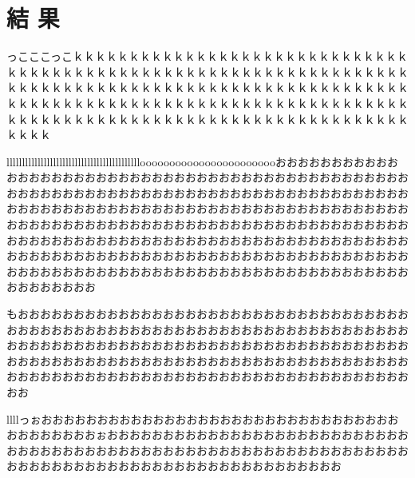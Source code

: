 \section{結 果}
っこここっこｋｋｋｋｋｋｋｋｋｋｋｋｋｋｋｋｋｋｋｋｋｋｋｋｋｋｋｋｋｋｋｋｋｋｋｋｋｋｋｋｋｋｋｋｋｋｋｋｋｋｋｋｋｋｋｋｋｋｋｋｋｋｋｋｋｋｋｋｋｋｋｋｋｋｋｋｋｋｋｋｋｋｋｋｋｋｋｋｋｋｋｋｋｋｋｋｋｋｋｋｋｋｋｋｋｋｋｋｋｋｋｋｋｋｋｋｋｋｋｋｋｋｋｋｋｋｋｋｋｋｋｋｋｋｋｋｋｋｋｋｋｋｋｋｋｋｋｋｋｋｋｋｋｋｋｋｋｋｋｋｋｋｋｋｋｋｋｋｋｋｋｋｋｋｋｋｋｋ

llllllllllllllllllllllllllllllllllllllllllloooooooooooooooooooooooおおおおおおおおおおおおおおおおおおおおおおおおおおおおおおおおおおおおおおおおおおおおおおおおおおおおおおおおおおおおおおおおおおおおおおおおおおおおおおおおおおおおおおおおおおおおおおおおおおおおおおおおおおおおおおおおおおおおおおおおおおおおおおおおおおおおおおおおおおおおおおおおおおおおおおおおおおおおおおおおおおおおおおおおおおおおおおおおおおおおおおおおおおおおおおおおおおおおおおおおおおおおおおおおおおおおおおおおおおおおおおおおおおおおおおおおおおおおおおおおおおおおおおおおおおおおおおおおおおおおおおおおおおおおおおお


もおおおおおおおおおおおおおおおおおおおおおおおおおおおおおおおおおおおおおおおおおおおおおおおおおおおおおおおおおおおおおおおおおおおおおおおおおおおおおおおおおおおおおおおおおおおおおおおおおおおおおおおおおおおおおおおおおおおおおおおおおおおおおおおおおおおおおおおおおおおおおおおおおおおおおおおおおおおおおおおおおおおおおおおおおおおおおおおおおおおおお

llllっぉおおおおおおおおおおおおおおおおおおおおおおおおおおおおおおおおおおおおおおおおぉおおおおおおおおおおおおおおおおおおおおおおおおおおおおおおおおおおおおおおおおおおおおおおおおおおおおおおおおおおおおおおおおおおおおおおおおおおおおおおおおおおおおおおおおおおおおお
